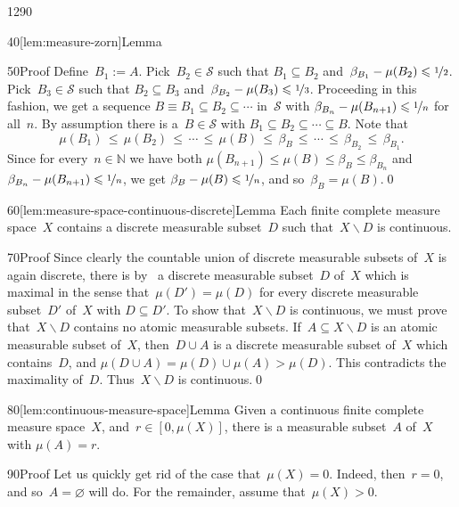 \begin{parsec}{1290}
\begin{point}{40}[lem:measure-zorn]{Lemma}
\begin{point}{50}{Proof}
Define~$B_1:= A$.
Pick~$B_2\in\mathcal{S}$
such that $B_1 \subseteq B_2$
and~$\beta_{B_1}-\mu(B_2)\leq \nicefrac{1}{2}$.
Pick~$B_3\in\mathcal{S}$
such that $B_2\subseteq B_3$
and~$\beta_{B_2}-\mu(B_3) \leq \nicefrac{1}{3}$.
Proceeding in this fashion,
we get a sequence $B\equiv B_1\subseteq B_2 \subseteq \dotsb$
in~$\mathcal{S}$
with $\beta_{B_{n}}-\mu(B_{n+1})\leq \nicefrac{1}{n}$
for all~$n$.
By assumption there is a~$B\in\mathcal{S}$
with $B_1\subseteq B_2\subseteq \dotsb \subseteq B$.
Note that
\begin{equation*}
\mu(B_1)\,\leq\, \mu(B_2)\,\leq\,
\dotsb \,\leq\,\mu(B)\,\leq\, \beta_B \,\leq\, \dotsb
\,\leq\, \beta_{B_2}\,\leq\, \beta_{B_1}.
\end{equation*}
Since for every~$n\in\mathbb{N}$
we have both $\mu(B_{n+1})\leq \mu(B)\leq \beta_B \leq \beta_{B_n}$
and $\beta_{B_n}- \mu(B_{n+1}) \leq \nicefrac{1}{n}$,
we get $\beta_B-\mu(B)\leq \nicefrac{1}{n}$,
and so~$\beta_B = \mu(B)$.\qed
\end{point}%
\end{point}%
\begin{point}{60}[lem:measure-space-continuous-discrete]{Lemma}%
Each finite complete  measure space~$X$ 
contains a  discrete measurable  subset~$D$
such that~$X\backslash D$ is continuous.
\begin{point}{70}{Proof}%
Since clearly the countable union
of discrete measurable subsets of~$X$
is again discrete,
there is by~
a discrete measurable subset~$D$ of~$X$
which is maximal in the sense that~$\mu(D')=\mu(D)$
for every discrete measurable subset~$D'$ of~$X$ with $D\subseteq D'$.
To show that~$X\backslash D$ is continuous,
we must prove that~$X\backslash D$
contains no atomic measurable subsets.
If~$A\subseteq X\backslash D$ is an atomic measurable subset
of~$X$,
then~$D\cup A$
is a discrete measurable
subset of~$X$
which contains~$D$,
and $\mu(D\cup A)=\mu(D)\cup \mu(A) > \mu(D)$.
This contradicts the  maximality of~$D$.
Thus~$X\backslash D$ is continuous.\qed
\end{point}
\end{point}
\begin{point}{80}[lem:continuous-measure-space]{Lemma}%
Given a continuous finite complete measure space~$X$,
and~$r\in [0,\mu(X)]$,
there is a measurable subset~$A$ of~$X$ with $\mu(A)=r$.
\begin{point}{90}{Proof}%
Let us quickly get rid of the case that~$\mu(X)=0$.
Indeed, then~$r=0$, and so~$A=\varnothing$ will do.
For the remainder, assume that~$\mu(X)>0$.


\end{point}
\end{point}
\end{parsec}
